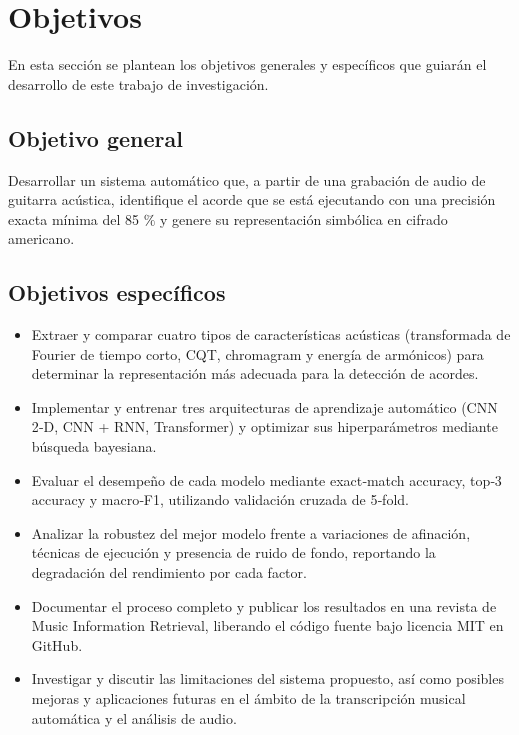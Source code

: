 \section{Objetivos}
En esta sección se plantean los objetivos generales y específicos que guiarán el desarrollo de este trabajo de investigación.

\subsection{Objetivo general}
Desarrollar un sistema automático que, a partir de una grabación de audio de guitarra acústica, identifique el acorde que se está ejecutando con una precisión exacta mínima del 85 $\%$ y genere su representación simbólica en cifrado americano.

\subsection{Objetivos específicos}
\begin{itemize}

\item  Extraer y comparar cuatro tipos de características acústicas (transformada de Fourier de tiempo corto, CQT, chromagram y energía de armónicos) para determinar la representación más adecuada para la detección de acordes.
\item  Implementar y entrenar tres arquitecturas de aprendizaje automático (CNN 2‑D, CNN + RNN, Transformer) y optimizar sus hiperparámetros mediante búsqueda bayesiana.
\item  Evaluar el desempeño de cada modelo mediante exact‑match accuracy, top‑3 accuracy y macro‑F1, utilizando validación cruzada de 5‑fold.
\item  Analizar la robustez del mejor modelo frente a variaciones de afinación, técnicas de ejecución y presencia de ruido de fondo, reportando la degradación del rendimiento por cada factor.

\item  Documentar el proceso completo y publicar los resultados en una revista de Music Information Retrieval, liberando el código fuente bajo licencia MIT en GitHub.
\item Investigar y discutir las limitaciones del sistema propuesto, así como posibles mejoras y aplicaciones futuras en el ámbito de la transcripción musical automática y el análisis de audio.

\end{itemize}